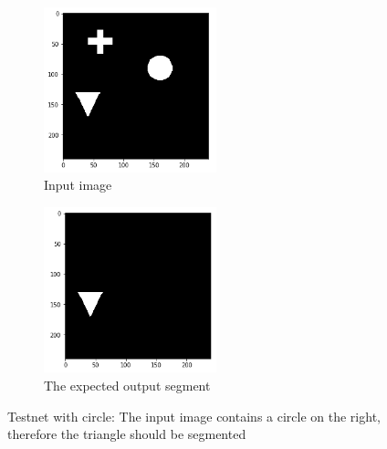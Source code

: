 \begin{figure}[H]
    \centering
    \begin{subfigure}{.5\textwidth}
        \centering
        \includegraphics[width=5cm]{chapters/05_testnet/images/testnet_a-0.png}
        \caption{Input image}
    \end{subfigure}%
    \begin{subfigure}{.5\textwidth}
        \centering
        \includegraphics[width=5cm]{chapters/05_testnet/images/testnet_a-1.png}
        \caption{The expected output segment}
    \end{subfigure}
    \caption{Testnet with circle: The input image contains a circle on the right, therefore the triangle should be segmented}
    \label{testnet_example_1}
\end{figure}

